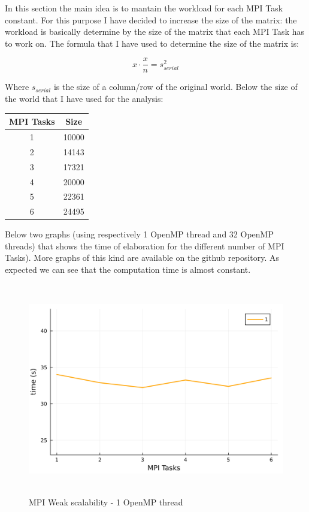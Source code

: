 \documentclass[
  letterpaper,
  DIV=11,
  numbers=noendperiod]{scrartcl}
\begin{document}
In this section the main idea is to mantain the workload for each MPI
Task constant. For this purpose I have decided to increase the size of
the matrix: the workload is basically determine by the size of the
matrix that each MPI Task has to work on. The formula that I have used
to determine the size of the matrix is:

\[
x\cdot \frac{x}{n} = s_{serial}^2
\]

Where \(s_{serial}\) is the size of a column/row of the original world.
Below the size of the world that I have used for the analysis:

\begin{longtable}[]{@{}cc@{}}
\toprule()
MPI Tasks & Size \\
\midrule()
\endhead
1 & 10000 \\
2 & 14143 \\
3 & 17321 \\
4 & 20000 \\
5 & 22361 \\
6 & 24495 \\
\bottomrule()
\end{longtable}

Below two graphs (using respectively 1 OpenMP thread and 32 OpenMP
threads) that shows the time of elaboration for the different number of
MPI Tasks). More graphs of this kind are available on the github
repository. As expected we can see that the computation time is almost
constant.

\begin{figure}

{\centering \includegraphics[width=\textwidth,height=3.64583in]{img/weak_scalability_mpi.png}

}

\caption{MPI Weak scalability - 1 OpenMP thread}

\end{figure}
\end{document}

